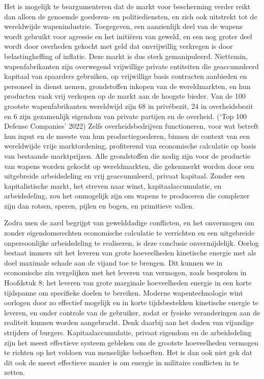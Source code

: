 \documentclass[
  a5paper,
  smalldemyvopaper,11pt,twoside,onecolumn,openright,extrafontsizes,
hidelinks]{memoir}
\begin{document}
Het is mogelijk te beargumenteren dat de markt voor bescherming verder
reikt dan alleen de genoemde goederen- en politiediensten, en zich ook
uitstrekt tot de wereldwijde wapenindustrie. Toegegeven, een aanzienlijk
deel van de wapens wordt gebruikt voor agressie en het initiëren van
geweld, en een nog groter deel wordt door overheden gekocht met geld dat
onvrijwillig verkregen is door belastingheffing of inflatie. Deze markt
is dus sterk gemanipuleerd. Niettemin, wapenfabrikanten zijn overwegend
vrijwillige private entiteiten die geaccumuleerd kapitaal van spaarders
gebruiken, op vrijwillige basis contracten aanbieden en personeel in
dienst nemen, grondstoffen inkopen van de wereldmarkten, en hun
producten vaak vrij verkopen op de markt aan de hoogste bieder. Van de
100 grootste wapenfabrikanten wereldwijd zijn 68 in privébezit, 24 in
overheidsbezit en 6 zijn gezamenlijk eigendom van private partijen en de
overheid. ({`Top 100 Defense Companies'} 2022) Zelfs overheidsbedrijven
functioneren, voor wat betreft hun input en de meeste van hun
productiegoederen, binnen de context van een wereldwijde vrije
marktordening, profiterend van economische calculatie op basis van
bestaande marktprijzen. Alle grondstoffen die nodig zijn voor de
productie van wapens worden gekocht op wereldmarkten, die gekenmerkt
worden door een uitgebreide arbeidsdeling en vrij geaccumuleerd, privaat
kapitaal. Zonder een kapitalistische markt, het streven naar winst,
kapitaalaccumulatie, en arbeidsdeling, zou het onmogelijk zijn om wapens
te produceren die complexer zijn dan rotsen, speren, pijlen en bogen, en
primitieve vallen.

Zodra men de aard begrijpt van gewelddadige conflicten, en het
onvermogen om zonder eigendomsrechten economische calculatie te
verrichten en een uitgebreide onpersoonlijke arbeidsdeling te
realiseren, is deze conclusie onvermijdelijk. Oorlog bestaat immers uit
het leveren van grote hoeveelheden kinetische energie met als doel
maximale schade aan de vijand toe te brengen. Dit kunnen we in
economische zin vergelijken met het leveren van vermogen, zoals
besproken in Hoofdstuk 8: het leveren van grote marginale hoeveelheden
energie in een korte tijdspanne om specifieke doelen te bereiken.
Moderne wapentechnologie wint oorlogen door zo effectief mogelijk en in
korte tijdsbestekken kinetische energie te leveren, en onder controle
van de gebruiker, zodat er fysieke veranderingen aan de realiteit kunnen
worden aangebracht. Denk daarbij aan het doden van vijandige strijders
of burgers. Kapitaalaccumulatie, privaat eigendom en de arbeidsdeling
zijn het meest effectieve systeem gebleken om de grootste hoeveelheden
vermogen te richten op het voldoen van menselijke behoeften. Het is dan
ook niet gek dat dit ook de meest effectieve manier is om energie in
militaire conflicten in te zetten.
\end{document}
